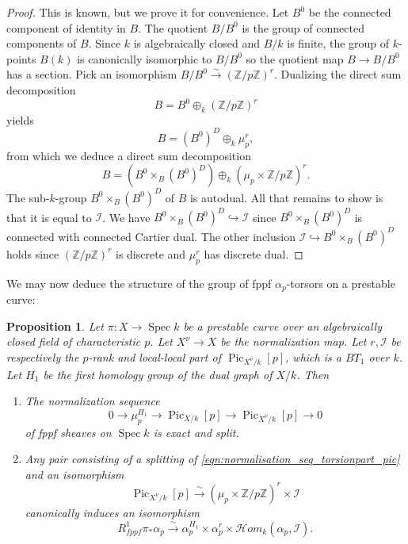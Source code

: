 \documentclass[a4paper,11pt]{amsart} %
\numberwithin{equation}{subsection}
\newcommand{\on}[1]{\operatorname{#1}}
\newcommand{\bb}[1]{{\mathbb{#1}}}
\newcommand{\ca}[1]{{\mathcal{#1}}}
\def\sheafhom{\mathcal{H}om}
\newcommand{\lra}{\longrightarrow}
\newcommand{\hra}{\hookrightarrow}
\newcommand{\iso}{\stackrel{\sim}{\lra}}
\newcommand{\Spec}{\operatorname{Spec}}
\theoremstyle{definition}
\theoremstyle{plain}%
\newtheorem{proposition}[definition]{Proposition}
\theoremstyle{remark}
\begin{document}
\begin{proof}
        This is known, but we prove it for convenience. Let $B^0$ be the connected component of identity in $B$. The quotient $B/B^0$ is the group of connected components of $B$. Since $k$ is algebraically closed and $B/k$ is finite, the group of $k$-points $B(k)$ is canonically isomorphic to $B/B^0$ so the quotient map $B \to B/B^0$ has a section. Pick an isomorphism $B/B^0 \iso (\bb Z/p\bb Z)^r$. Dualizing the direct sum decomposition
        \[
        B = B^0 \oplus_k (\bb Z/p\bb Z)^r
        \]
        yields
        \begin{equation*}
            B = (B^0)^D \oplus_k \mu_p^r,
        \end{equation*}
        from which we deduce a direct sum decomposition
        \begin{equation}\label{eqnpigwrn}
            B = \left(B^0 \times_B (B^0)^D\right) \oplus_k (\mu_p \times \bb Z/p\bb Z)^r.
        \end{equation}
        The sub-$k$-group $B^0 \times_B (B^0)^D$ of $B$ is autodual. All that remains to show is that it is equal to $\ca I$. We have $B^0 \times_B (B^0)^D \hra \ca I$ since $B^0 \times_B (B^0)^D$ is connected with connected Cartier dual. The other inclusion $\ca I \hra B^0 \times_B (B^0)^D$ holds since $(\bb Z/p\bb Z)^r$ is discrete and $\mu_p^r$ has discrete dual.
\end{proof}

We may now deduce the structure of the group of fppf $\alpha_p$-torsors on a prestable curve:

\begin{proposition}\label{proposition:structure_alpha_p_torsors}
    Let $\pi \colon X \to \Spec k$ be a prestable curve over an algebraically closed field of characteristic $p$. Let $X^\nu \to X$ be the normalization map. Let $r,\ca I$ be respectively the $p$-rank and local-local part of $\on{Pic}_{X^\nu/k}[p]$, which is a $BT_1$  over $k$. Let $H_1$ be the first homology group of the dual graph of $X/k$. Then
    \begin{enumerate}
        \item The normalization sequence
        \begin{equation}\label{eqn:normalisation_seq_torsionpart_pic}
       0 \to \bb \mu_p^{H_1} \to \on{Pic}_{X/k}[p] \to \on{Pic}_{X^\nu/k}[p] \to 0 
    \end{equation}
    of fppf sheaves on $\Spec k$ is exact and split.
    \item Any pair consisting of a splitting of \ref{eqn:normalisation_seq_torsionpart_pic} and an isomorphism
    \[
    \on{Pic}_{X^\nu/k}[p] \iso (\mu_p \times \bb Z/p\bb Z)^r \times \ca I
    \]
    canonically induces an isomorphism
    \[
    R^1_{fppf}\pi_*\alpha_p \iso \alpha_p^{H_1} \times \alpha_p^r \times \sheafhom_k(\alpha_p,\ca I).
    \]
    \end{enumerate}
\end{proposition}
\end{document}
